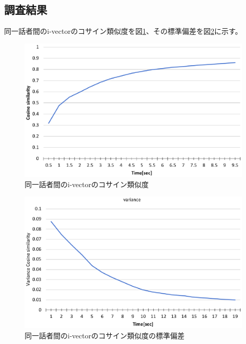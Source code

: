 \subsection{調査結果}
\par
同一話者間のi-vectorのコサイン類似度を図\ref{fig:same_cos_hist}、その標準偏差を図\ref{fig:same_cos_vari}に示す。\par

\begin{figure}[H]
  \begin{center}
    \includegraphics[scale=0.8]{./figure/same_cos_hist.eps}
  \end{center}
  \caption{同一話者間のi-vectorのコサイン類似度 \label{fig:same_cos_hist}}
\end{figure}

\begin{figure}[H]
  \begin{center}
    \includegraphics[scale=0.8]{./figure/same_cos_vari.eps}
  \end{center}
  \caption{同一話者間のi-vectorのコサイン類似度の標準偏差 \label{fig:same_cos_vari}}
\end{figure}

